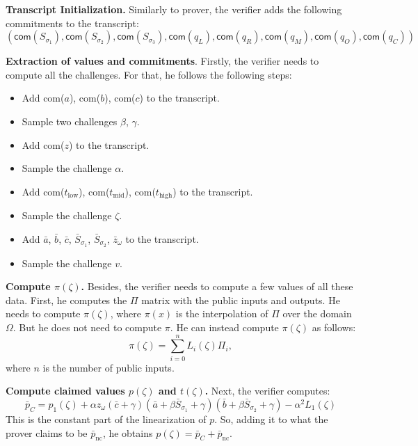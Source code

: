 \documentclass[../lecture-notes.tex]{subfiles}
\begin{document}
\textcolor{blue!60!black}{\textbf{Transcript Initialization.}} Similarly to
prover, the verifier adds the following commitments to the transcript:
\begin{equation*}
    (\mathsf{com}(S_{\sigma_1}), \mathsf{com}(S_{\sigma_2}), \mathsf{com}(S_{\sigma_3}), \mathsf{com}(q_L), \mathsf{com}(q_R), \mathsf{com}(q_M), \mathsf{com}(q_O), \mathsf{com}(q_C))
\end{equation*}

\textcolor{blue!60!black}{\textbf{Extraction of values and commitments}.}
Firstly, the verifier needs to compute all the challenges. For that, he follows
the following steps:
\begin{itemize}
    \item Add com($a$), com($b$), com($c$) to the transcript.
    \item Sample two challenges $\beta$, $\gamma$.
    \item Add com($z$) to the transcript.
    \item Sample the challenge $\alpha$.
    \item Add com($t_{\text{low}}$), com($t_{\text{mid}}$), com($t_{\text{high}}$) to the transcript.
    \item Sample the challenge $\zeta$.
    \item Add $\bar{a}$, $\bar{b}$, $\bar{c}$, $\bar{S}_{\sigma_1}$, $\bar{S}_{\sigma_2}$, $\bar{z}_{\omega}$ to the transcript.
    \item Sample the challenge $v$.
\end{itemize}

\textcolor{blue!60!black}{\textbf{Compute $\pi(\zeta)$.}} Besides, the verifier
needs to compute a few values of all these data. First, he computes the $\Pi$
matrix with the public inputs and outputs. He needs to compute $\pi(\zeta)$,
where $\pi(x)$ is the interpolation of $\Pi$ over the domain $\Omega$. But he
does not need to compute $\pi$. He can instead compute $\pi(\zeta)$ as follows:
\begin{equation*}
    \pi(\zeta) = \sum_{i=0}^n L_i(\zeta)\Pi_{i},
\end{equation*}
where $n$ is the number of public inputs.

\textcolor{blue!60!black}{\textbf{Compute claimed values $p(\zeta)$ and
$t(\zeta)$.}} Next, the verifier computes: 
\[\bar{p}_C = p_1(\zeta) + \alpha z_{\omega} \left( \bar{c} + \gamma \right)
\left( \bar{a} + \beta \bar{S}_{\sigma_1} + \gamma \right) \left( \bar{b} +
\beta \bar{S}_{\sigma_2} + \gamma \right) - \alpha^2 L_1(\zeta)\] This is the
constant part of the linearization of $p$. So, adding it to what the prover
claims to be $\bar{p}_{\text{nc}}$, he obtains $p(\zeta) = \bar{p}_C + \bar{p}_{\text{nc}}$.
\end{document}
